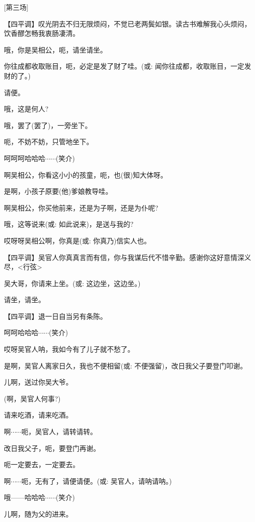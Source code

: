 {{{[}第三场{]}}

\setlength{\hangindent}{60pt} {【四平调】叹光阴去不归无限烦闷，不觉已老两鬓如银。读古书难解我心头烦闷，饮香醪怎畅我衷肠凄清。}

{哦，你是吴相公，呃，请坐请坐。}

{你往成都收取账目，呃，必定是发了财了哇。({\akai 或}: }闻你往成都，收取账目，一定发财的了。{)}

{请便。}

{哦，这是何人?}

{哦，罢了(罢了)，一旁坐下。}

{呃，不妨不妨，只管地坐下。}

{呵呵呵哈哈哈$\cdots{}\cdots{}$(笑介)}

{啊吴相公，你看这小小的孩童，呃，也(很)知大体呀。}

{是啊，小孩子原要(他)爹娘教导哇。}

{啊吴相公，你买他前来，还是为子啊，还是为仆呢?}

{哦，这等说来({\akai 或}: }如此说来){，是送与我的?}

{哎呀呀吴相公啊，你真是({\akai 或}: }你真乃){信实人也。}

\setlength{\hangindent}{60pt} {【四平调】吴官人你真真言而有信，你与我谋后代不惜辛勤。感谢你这好意情深义尽，\textless{}行弦\textgreater{}}

{吴大哥，你请来上坐。({\akai 或}: }这边坐，这边坐。{)}

{请坐，请坐。}

\setlength{\hangindent}{60pt} {【四平调】退一日自当另有条陈。}

{呵呵哈哈哈$\cdots{}\cdots{}$(笑介)}

{哎呀吴官人呐，我如今有了儿子就不愁了。}

{是啊，吴官人离家日久，我也不便相留({\akai 或}: }不便强留{)，改日我父子要登门叩谢。}

{儿啊，送过你吴大爷。}

{(啊，吴官人何事?)}

{请来吃酒，请来吃酒。}

{啊$\cdots{}\cdots{}$呃，吴官人，请转请转。}

{改日我父子，呃，要登门再谢。}

{呃一定要去，一定要去。}

{啊$\cdots{}\cdots{}$呃，无有了，请便请便。({\akai 或}: }吴官人，请呐请呐。{)}

{哦------哈哈哈$\cdots{}\cdots{}$(笑介)}

{儿啊，随为父的进来。}

}

